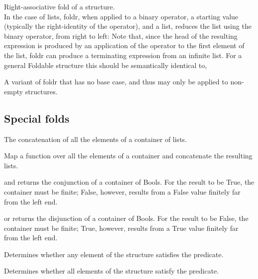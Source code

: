 Right-associative fold of a structure.\\
In the case of lists, foldr, when applied to a binary operator, a starting value (typically the right-identity of the operator), and a list, reduces the list using the binary operator, from right to left:
Note that, since the head of the resulting expression is produced by an application of the operator to the first element of the list, foldr can produce a terminating expression from an infinite list.
For a general Foldable structure this should be semantically identical to,

A variant of foldr that has no base case, and thus may only be applied to non-empty structures.

\subsection{Special folds}
The concatenation of all the elements of a container of lists.

Map a function over all the elements of a container and concatenate the resulting lists.

and returns the conjunction of a container of Bools. For the result to be True, the container must be finite; False, however, results from a False value finitely far from the left end.

or returns the disjunction of a container of Bools. For the result to be False, the container must be finite; True, however, results from a True value finitely far from the left end.

Determines whether any element of the structure satisfies the predicate.

Determines whether all elements of the structure satisfy the predicate.

